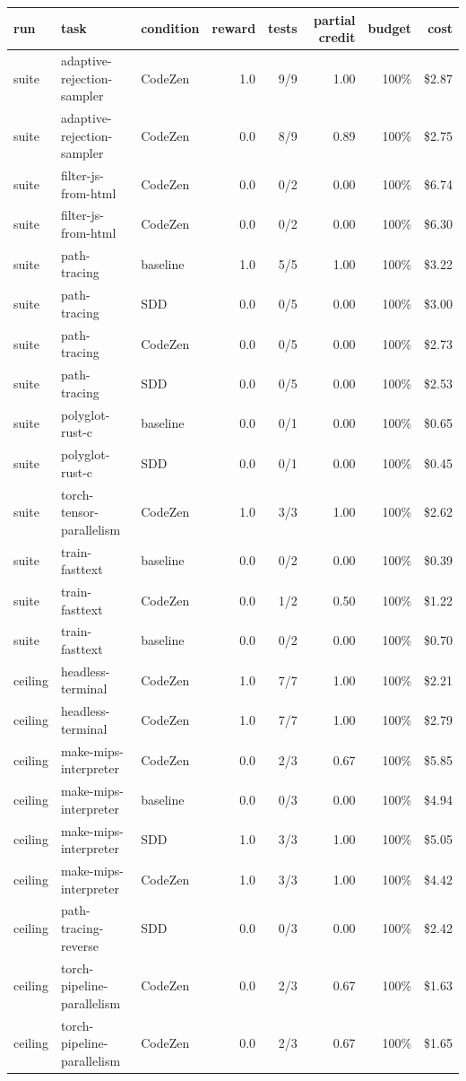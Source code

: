 
\begin{tabular}{@{}lllrrrrr@{}}
\toprule
run & task & condition & reward & tests & partial credit & budget & cost \\
\midrule
suite & adaptive-rejection-sampler & CodeZen & 1.0 & 9/9 & 1.00 & 100\% & \$2.87 \\
suite & adaptive-rejection-sampler & CodeZen & 0.0 & 8/9 & 0.89 & 100\% & \$2.75 \\
suite & filter-js-from-html & CodeZen & 0.0 & 0/2 & 0.00 & 100\% & \$6.74 \\
suite & filter-js-from-html & CodeZen & 0.0 & 0/2 & 0.00 & 100\% & \$6.30 \\
suite & path-tracing & baseline & 1.0 & 5/5 & 1.00 & 100\% & \$3.22 \\
suite & path-tracing & SDD & 0.0 & 0/5 & 0.00 & 100\% & \$3.00 \\
suite & path-tracing & CodeZen & 0.0 & 0/5 & 0.00 & 100\% & \$2.73 \\
suite & path-tracing & SDD & 0.0 & 0/5 & 0.00 & 100\% & \$2.53 \\
suite & polyglot-rust-c & baseline & 0.0 & 0/1 & 0.00 & 100\% & \$0.65 \\
suite & polyglot-rust-c & SDD & 0.0 & 0/1 & 0.00 & 100\% & \$0.45 \\
suite & torch-tensor-parallelism & CodeZen & 1.0 & 3/3 & 1.00 & 100\% & \$2.62 \\
suite & train-fasttext & baseline & 0.0 & 0/2 & 0.00 & 100\% & \$0.39 \\
suite & train-fasttext & CodeZen & 0.0 & 1/2 & 0.50 & 100\% & \$1.22 \\
suite & train-fasttext & baseline & 0.0 & 0/2 & 0.00 & 100\% & \$0.70 \\
ceiling & headless-terminal & CodeZen & 1.0 & 7/7 & 1.00 & 100\% & \$2.21 \\
ceiling & headless-terminal & CodeZen & 1.0 & 7/7 & 1.00 & 100\% & \$2.79 \\
ceiling & make-mips-interpreter & CodeZen & 0.0 & 2/3 & 0.67 & 100\% & \$5.85 \\
ceiling & make-mips-interpreter & baseline & 0.0 & 0/3 & 0.00 & 100\% & \$4.94 \\
ceiling & make-mips-interpreter & SDD & 1.0 & 3/3 & 1.00 & 100\% & \$5.05 \\
ceiling & make-mips-interpreter & CodeZen & 1.0 & 3/3 & 1.00 & 100\% & \$4.42 \\
ceiling & path-tracing-reverse & SDD & 0.0 & 0/3 & 0.00 & 100\% & \$2.42 \\
ceiling & torch-pipeline-parallelism & CodeZen & 0.0 & 2/3 & 0.67 & 100\% & \$1.63 \\
ceiling & torch-pipeline-parallelism & CodeZen & 0.0 & 2/3 & 0.67 & 100\% & \$1.65 \\
\bottomrule
\end{tabular}
